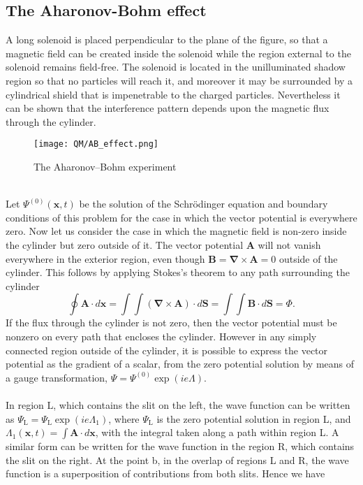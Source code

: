 \subsection{The Aharonov-Bohm effect}
A long solenoid is placed perpendicular to the plane of the figure, so that a magnetic field can be created inside the solenoid while the region external to the solenoid remains field-free. The solenoid is located in the unilluminated shadow region so that no particles will reach it, and moreover it may be surrounded by a cylindrical shield that is impenetrable to the charged particles. Nevertheless it can be shown that the interference pattern depends upon the magnetic flux through the cylinder.\\
\begin{figure}[!h]
	\centering
	\texttt{[image: QM/AB\_effect.png]}
	\caption{The Aharonov–Bohm experiment}
\end{figure}\\
Let $\Psi^{(0)}(\bm{x},t)$ be the solution of the Schrödinger equation and boundary conditions of this problem for the case in which the vector potential is everywhere zero. Now let us consider the case in which the magnetic field is non-zero inside the cylinder but zero outside of it. The vector potential $\bm{A}$ will not vanish everywhere in the exterior region, even though $\bm{B}=\bm{\nabla}\times\bm{A}=0$
outside of the cylinder. This follows by applying Stokes's theorem to any path surrounding the cylinder
\[\oint \bm{A}\cdot d\bm{x} = \int\int (\bm{\nabla}\times\bm{A})\cdot d\bm{S} = \int\int \bm{B}\cdot d\bm{S} = \Phi.\]
If the flux through the cylinder is not zero, then the vector potential must be nonzero on every path that encloses the cylinder. However in any simply connected region outside of the cylinder, it is possible to express the vector potential as the gradient of a scalar, from the zero potential solution by means of a gauge transformation, $\Psi = \Psi^{(0)}\exp(ie\Lambda)$.
\\ \\
In region L, which contains the slit on the left, the wave function can be written as $\Psi_{\mathrm{L}} = \Psi_{\mathrm{L}}\exp(ie\Lambda_1)$, where $\Psi_{\mathrm{L}}$ is the zero potential solution in region L, and $\Lambda_1(\bm{x},t) = \int \bm{A}\cdot d\bm{x}$, with the integral taken along a path within region L. A similar form can be written for the wave function in the region R, which contains the slit on the right.
At the point b, in the overlap of regions L and R, the wave function is a superposition of contributions from both slits. Hence we have
